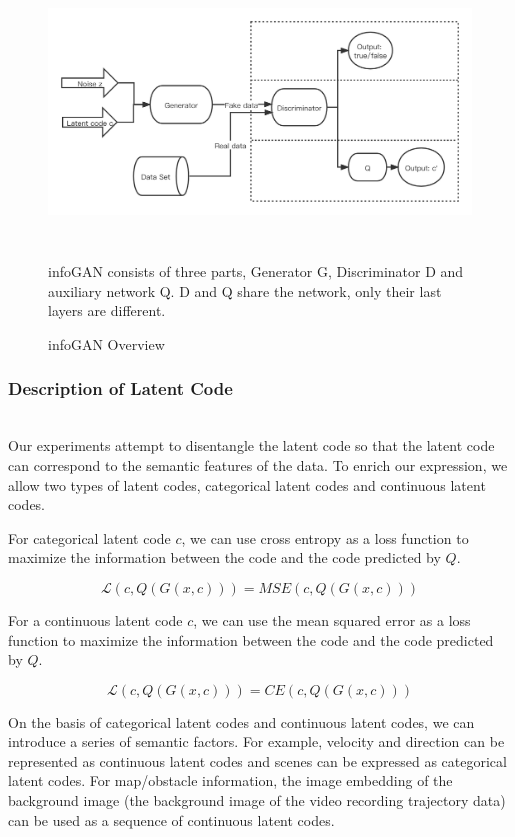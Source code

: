 \begin{figure}[h]
  \centering
  \includegraphics[width=\textwidth, height = 7cm]{figures/infoGAN.png}
  \caption{infoGAN Overview}{infoGAN consists of three parts, Generator G, Discriminator D and auxiliary network Q. D and Q share the network, only their last layers are different.}
  \label{infoGan}
\end{figure}
\subsubsection{Description of Latent Code}

\hfill \\
Our experiments attempt to disentangle the latent code so that the latent code can correspond to the semantic features of the data. To enrich our expression, we allow two types of latent codes, categorical latent codes and continuous latent codes.

For categorical latent code $c$, we can use cross entropy as a loss function to maximize the information between the code and the code predicted by $Q$.


$$\mathcal{L} (c, Q(G(x, c))) = MSE(c, Q(G(x, c))) $$

For a continuous latent code $c$, we can use the mean squared error as a loss function to maximize the information between the code and the code predicted by $Q$.

$$\mathcal{L} (c, Q(G(x, c))) = CE(c, Q(G(x, c))) $$

On the basis of categorical latent codes and continuous latent codes, we can introduce a series of semantic factors. For example, velocity and direction can be represented as continuous latent codes and scenes can be expressed as categorical latent codes. For map/obstacle information, the image embedding of the background image (the background image of the video recording trajectory data) can be used as a sequence of continuous latent codes.

